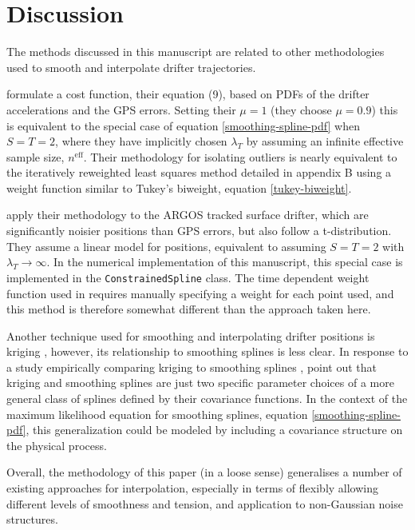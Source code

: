 \documentclass{ametsoc}
\begin{document}
\section{Discussion}

The methods discussed in this manuscript are related to other methodologies used to smooth and interpolate drifter trajectories.

\citet{yaremchuk2015-joe} formulate a cost function, their equation (9), based on PDFs of the drifter accelerations and the GPS errors. Setting their $\mu=1$ (they choose $\mu=0.9$) this is equivalent to the special case of equation \eqref{smoothing-spline-pdf} when $S=T=2$, where they have implicitly chosen $\lambda_T$ by assuming an infinite effective sample size, $n^\textrm{eff}$. Their methodology for isolating outliers is nearly equivalent to the iteratively reweighted least squares method detailed in appendix B using a weight function similar to Tukey's biweight, equation \ref{tukey-biweight}.

\citet{elipot2016-jgr} apply their methodology to the ARGOS tracked surface drifter, which are significantly noisier positions than GPS errors, but also follow a t-distribution. They assume a linear model for positions, equivalent to assuming $S=T=2$ with $\lambda_T \rightarrow \infty$. In the numerical implementation of this manuscript, this special case is implemented in the \texttt{ConstrainedSpline} class. The time dependent weight function used in \citet{elipot2016-jgr} requires manually specifying a weight for each point used, and this method is therefore somewhat different than the approach taken here.

Another technique used for smoothing and interpolating drifter positions is kriging \citep{hansen1996-jtech}, however, its relationship to smoothing splines is less clear. In response to a study empirically comparing kriging to smoothing splines \citep{laslett1994-jasa},  \citet{handcock1994-jasa} point out that kriging and smoothing splines are just two specific parameter choices of a more general class of splines defined by their covariance functions. In the context of the maximum likelihood equation for smoothing splines, equation \eqref{smoothing-spline-pdf}, this generalization could be modeled by including a covariance structure on the physical process. 

Overall, the methodology of this paper (in a loose sense) generalises a number of existing approaches for interpolation, especially in terms of flexibly allowing different levels of smoothness and tension, and application to non-Gaussian noise structures.
\end{document}
